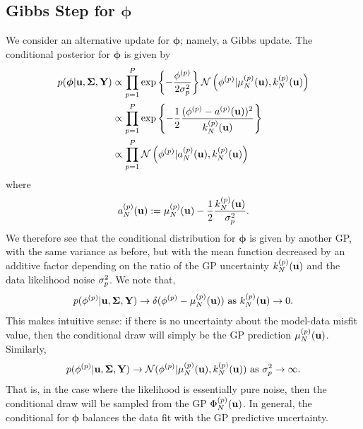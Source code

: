 \documentclass[12pt]{article}
\newcommand{\bphi}{\boldsymbol{\phi}}
\begin{document}
\subsection{Gibbs Step for $\bphi$}
We consider an alternative update for $\bphi$; namely, a Gibbs update. The conditional posterior for $\bphi$ is given by 
\begin{align*}
p(\bphi | \bpar, \CovObs, \stateMat) 
&\propto \prod_{\objIdx=1}^{\Nobj} \exp\left\{-\frac{\indexObj{\phi}}{2\sdObs^2_{\objIdx}} \right\} 
	\Gaussian\left(\indexObj{\phi} | \GPMeanPredOut{\Ndesign}{\objIdx}(\bpar), \GPKerPredOut{\Ndesign}{\objIdx}(\bpar)\right) \\
&\propto \prod_{\objIdx=1}^{\Nobj} \exp\left\{-\frac{1}{2} \frac{(\indexObj{\phi} - \indexObj{a}(\bpar))^2}{\GPKerPredOut{\Ndesign}{\objIdx}(\bpar)} \right\} \\
&\propto \prod_{\objIdx=1}^{\Nobj} \Gaussian\left(\indexObj{\phi} | \indexObj{a}_{\Ndesign}(\bpar), \GPKerPredOut{\Ndesign}{\objIdx}(\bpar)\right)
\end{align*}
where 
\begin{align}
{a}^{(p)}_{N}(\mathbf{u}) := \mu_{N}^{(p)}(\mathbf{u}) - \frac{1}{2}\frac{k_{N}^{(p)}(\mathbf{u})}{\sigma^2_{p}}. \label{gp_gibbs_mean}
\end{align}
We therefore see that 
the conditional distribution for $\bphi$ is given by another GP, with the same variance as before, but with the mean function decreased by an additive factor depending on the 
ratio of the GP uncertainty $k_{N}^{(p)}(\mathbf{u})$ and the data likelihood noise $\sigma^2_{p}$. We note that, 
\begin{align*}
p({\phi}^{(p)} | \mathbf{u}, \boldsymbol{\Sigma}, \mathbf{Y}) \to \delta({\phi}^{(p)} - \mu_{N}^{(p)}(\mathbf{u})) \text{ as } k_{N}^{(p)}(\mathbf{u}) \to 0.
\end{align*}
This makes intuitive sense: if there is no uncertainty about the model-data misfit value, then the conditional draw will simply be the GP prediction $\mu_{N}^{(p)}(\mathbf{u})$.
Similarly, 
\begin{align*}
p({\phi}^{(p)} | \mathbf{u}, \boldsymbol{\Sigma}, \mathbf{Y}) \to \mathcal{N}({\phi}^{(p)}|\mu_{N}^{(p)}(\mathbf{u}) , k_{N}^{(p)}(\mathbf{u})) \text{ as } \sigma^2_{p} \to \infty.
\end{align*}
That is, in the case where the likelihood is essentially pure noise, then the conditional draw will be sampled from the GP $\Phi_{N}^{(p)}(\mathbf{u})$. In general, the 
conditional for $\bphi$ balances the data fit with the GP predictive uncertainty.
\end{document}
